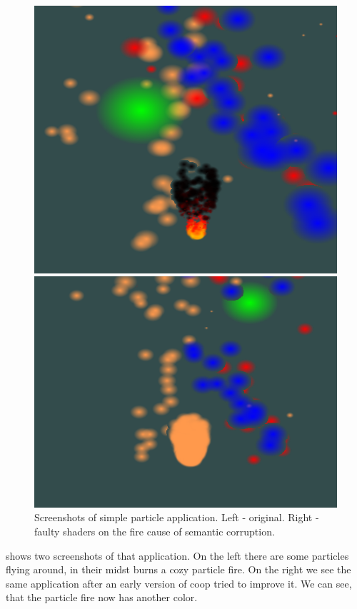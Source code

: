 \begin{figure}[ht]
	\begin{minipage}[b]{0.5\linewidth}
		\centering
		\includegraphics[width=\textwidth,height=.7\textwidth]{PICs/particles}
	\end{minipage}
	\hspace{0.5cm}
	\begin{minipage}[b]{0.5\linewidth}
		\centering
		\includegraphics[width=\textwidth,height=.7\textwidth]{PICs/particles_faulty}
	\end{minipage}
\caption{Screenshots of simple particle application. Left - original. Right - faulty shaders on the fire cause of semantic corruption.}\label{particles_faulty}
\end{figure}
 shows two screenshots of that application. On the left there are some particles flying around, in their midst burns a cozy particle fire. On the right we see the same application after an early version of coop tried to improve it. We can see, that the particle fire now has another color.\\
